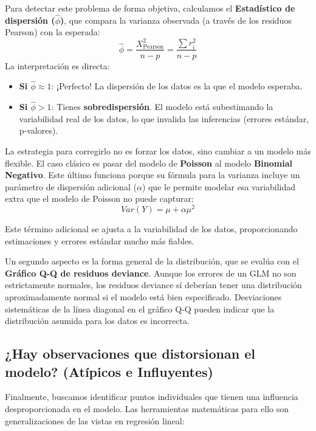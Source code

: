 \documentclass[
  letterpaper,
  DIV=11,
  numbers=noendperiod]{scrreprt}
\providecommand{\tightlist}{%
  \setlength{\itemsep}{0pt}\setlength{\parskip}{0pt}}
\begin{document}
Para detectar este problema de forma objetiva, calculamos el
\textbf{Estadístico de dispersión (\(\hat{\phi}\))}, que compara la
varianza observada (a través de los residuos Pearson) con la esperada:
\[\hat{\phi} = \frac{X^2_{\text{Pearson}}}{n-p} = \frac{\sum r_i^2}{n-p}\]
La interpretación es directa:

\begin{itemize}
\tightlist
\item
  \textbf{Si \(\hat{\phi} \approx 1\)}: ¡Perfecto! La dispersión de los
  datos es la que el modelo esperaba.
\item
  \textbf{Si \(\hat{\phi} > 1\)}: Tienes \textbf{sobredispersión}. El
  modelo está subestimando la variabilidad real de los datos, lo que
  invalida las inferencias (errores estándar, p-valores).
\end{itemize}

La estrategia para corregirlo no es forzar los datos, sino cambiar a un
modelo más flexible. El caso clásico es pasar del modelo de
\textbf{Poisson} al modelo \textbf{Binomial Negativo}. Este último
funciona porque su fórmula para la varianza incluye un parámetro de
dispersión adicional (\(\alpha\)) que le permite modelar esa
variabilidad extra que el modelo de Poisson no puede capturar:
\[Var(Y) = \mu + \alpha\mu^2\]

Este término adicional se ajusta a la variabilidad de los datos,
proporcionando estimaciones y errores estándar mucho más fiables.

Un segundo aspecto es la forma general de la distribución, que se evalúa
con el \textbf{Gráfico Q-Q de residuos deviance}. Aunque los errores de
un GLM no son estrictamente normales, los residuos deviance sí deberían
tener una distribución aproximadamente normal si el modelo está bien
especificado. Desviaciones sistemáticas de la línea diagonal en el
gráfico Q-Q pueden indicar que la distribución asumida para los datos es
incorrecta.

\subsection{¿Hay observaciones que distorsionan el modelo? (Atípicos e
Influyentes)}\label{hay-observaciones-que-distorsionan-el-modelo-atuxedpicos-e-influyentes}

Finalmente, buscamos identificar puntos individuales que tienen una
influencia desproporcionada en el modelo. Las herramientas matemáticas
para ello son generalizaciones de las vistas en regresión lineal:
\end{document}
